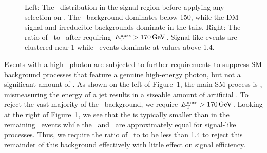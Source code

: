 \begin{figure}[htbp]
  \centering
  \caption{
    Left: The \met\ distribution in the signal region before applying any selection on \met. 
    The \gj\ background dominates below 150\GeV, while the DM signal and irreducible backgrounds dominate in the tails.
    Right: The ratio of \ETg\ to \met\ after requiring $E_{\mathrm{T}}^{\text{miss}} > 170\,\text{Ge\hspace{-.08em}V}$.
    Signal-like events are clustered near 1 while \gj\ events dominate at values above 1.4.  
  }
  \label{fig:metcuts}
\end{figure}

Events with a high-\pt\ photon are subjected to further requirements to suppress SM background processes that feature a genuine high-energy photon, but not a significant amount of \met.
As shown on the left of Figure~\ref{fig:metcuts}, the main SM process is \gj, mismeasuring the energy of a jet results in a sizeable amount of artificial \met.
To reject the vast majority of the \gj\ background, we require $E_{\mathrm{T}}^{\text{miss}} > 170\,\text{Ge\hspace{-.08em}V}$.
Looking at the right of Figure~\ref{fig:metcuts}, we see that the \met is typically smaller than \ETg in the remaining \gj\ events while the \met\ and \ETg\ are approximately equal for signal-like processes.
Thus, we require the ratio of \ETg\ to \met to be less than 1.4 to reject this remainder of this background effectively with little effect on signal efficiency.

